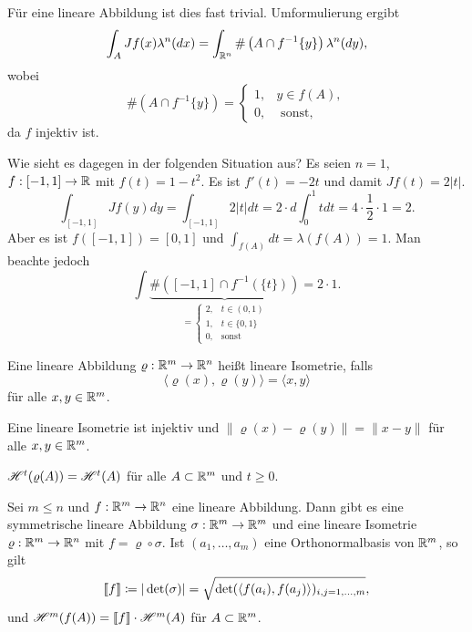 \documentclass[a4paper,twoside,DIV15,BCOR12mm]{scrbook}
\newcommand{\HM}{\H}
\begin{document}
Für eine lineare Abbildung ist dies fast trivial. Umformulierung ergibt
\[
\int_A Jf(x)\lambda^n(dx)=\int_{\mathbb{R}^n}\#\left(A\cap f^{-1}\{y\}\right)\lambda^n(dy),
\]
wobei
$$
\#\left(A\cap f^{-1}\{y\}\right)=\begin{cases} 1,&y\in f(A),\\0,&\text{ sonst}, 
\end{cases}
$$
da $f$ injektiv ist.

\begin{beispiel}
Wie sieht es dagegen in der folgenden Situation aus?
Es seien $n=1$, $f:[-1,1]\to\mathbb{R}$ mit $f(t) = 1-t^2$. Es ist $f'(t) = -2t$ und damit $Jf(t)=2|t|$.
\[
\int_{[-1,1]}Jf(y) dy = \int_{[-1,1]} 2|t|dt = 2 \cdot d\int_0^1 tdt = 4 \cdot \frac12 \cdot 1 = 2.
\]
Aber es ist $f([-1,1]) = [0,1]$ und $\int_{f(A)}dt = \lambda(f(A)) = 1$. Man beachte jedoch
\[
\int \underbrace{\#( [-1,1] \cap f^{-1}(\{t\}))}_{
=\begin{cases}
2, & t\in(0,1) \\
1, & t\in\{0,1\} \\
0, & \text{sonst}
\end{cases}
}=  2\cdot 1.
\]
\end{beispiel}

\begin{definition}
Eine lineare Abbildung $\varrho: \mathbb{R}^m \to \mathbb{R}^n$ heißt lineare Isometrie, falls
\[
\langle \varrho(x), \varrho(y) \rangle = \langle x,y \rangle
\]
für alle $x,y\in\mathbb{R}^m$.
\end{definition}

\begin{bemerkungen}
\item Eine lineare Isometrie ist injektiv und $\|\varrho(x) - \varrho(y)\| = \|x-y\|$ für alle $x,y\in\mathbb{R}^m$.
\item $\HM^t(\varrho(A)) = \HM^t(A)$ für alle $A\subset \mathbb{R}^m$ und $t\ge 0$.
\end{bemerkungen}

\begin{lemma}
\label{lem:3.4}
Sei $m\le n$ und $f:\mathbb{R}^m \to \mathbb{R}^n$ eine lineare Abbildung. Dann gibt es eine symmetrische lineare Abbildung $\sigma: \mathbb{R}^m\to\mathbb{R}^m$ und eine lineare Isometrie $\varrho:\mathbb{R}^m\to\mathbb{R}^n$ mit $f =\varrho \circ \sigma$. Ist $(a_1,\ldots,a_m)$ eine Orthonormalbasis von $\mathbb{R}^m$, so gilt
\[
\llbracket f \rrbracket \da |\det(\sigma)| = \sqrt{ \det(\langle f(a_i),f(a_j)\rangle)_{i,j=1,\ldots,m}},
\]
und $\HM^m(f(A)) = \llbracket f \rrbracket \cdot \HM^m(A)$ für $A\subset \mathbb{R}^m$.
\end{lemma}
\end{document}
